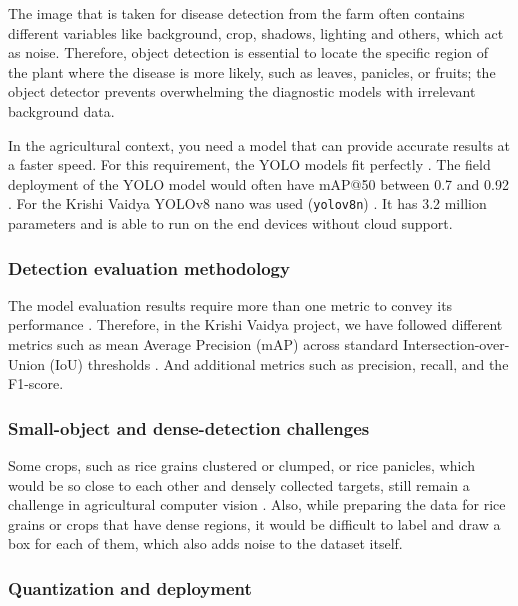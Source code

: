 The image that is taken for disease detection from the farm often contains different variables like background, crop, shadows, lighting and others, which act as noise. Therefore, object detection is essential to locate the specific region of the plant where the disease is more likely, such as leaves, panicles, or fruits; the object detector prevents overwhelming the diagnostic models with irrelevant background data.

In the agricultural context, you need a model that can provide accurate results at a faster speed. For this requirement, the YOLO models fit perfectly \parencite{jiangYOLOSurvey2022}. The field deployment of the YOLO model would often have mAP@50 between 0.7 and 0.92 \parencite{tian2020AppleFruitYOLO,zhengSmallObjDetAgri2023}. For the Krishi Vaidya YOLOv8 nano was used (\texttt{yolov8n}) \parencite{ultralyticsYolov8}. It has 3.2 million parameters and is able to run on the end devices without cloud support. 

\subsubsection{Detection evaluation methodology}

The model evaluation results require more than one metric to convey its performance \parencite{padillaMetricsSurvey2021}. Therefore, in the Krishi Vaidya project, we have followed different metrics such as mean Average Precision (mAP) across standard Intersection-over-Union (IoU) thresholds \parencite{everinghamPASCALVOC2010,linCOCO2014}. And additional metrics such as precision, recall, and the F1-score.

\subsubsection{Small-object and dense-detection challenges}

Some crops, such as rice grains clustered or clumped, or rice panicles, which would be so close to each other and densely collected targets, still remain a challenge in agricultural computer vision \parencite{zhengSmallObjDetAgri2023}. Also, while preparing the data for rice grains or crops that have dense regions, it would be difficult to label and draw a box for each of them, which also adds noise to the dataset itself. 

\subsubsection{Quantization and deployment}

